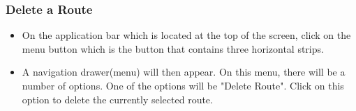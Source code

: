 \documentclass[a4paper,12pt]{article}
\begin{document}
\subsubsection{Delete a Route}
\begin{itemize}
    \item On the application bar which is located at the top of the screen, click on the menu button which is the button that contains three horizontal strips.
    \item A navigation drawer(menu) will then appear. On this menu, there will be a number of options. One of the options will be "Delete Route". Click on this option to delete the currently selected route.
\end{itemize}
\end{document}
